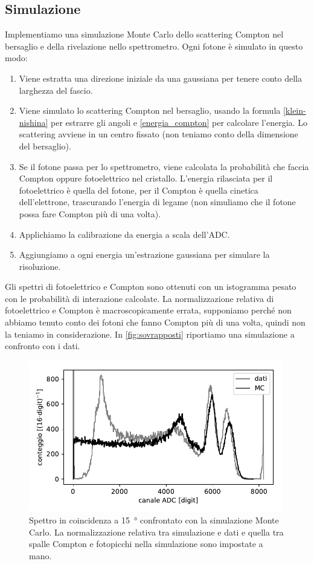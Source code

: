 \subsection{Simulazione}

Implementiamo una simulazione Monte Carlo dello scattering Compton nel bersaglio
e della rivelazione nello spettrometro.
Ogni fotone è simulato in questo modo:
\begin{enumerate}
	\item Viene estratta una direzione iniziale da una gaussiana per tenere conto della larghezza del fascio.
	\item Viene simulato lo scattering Compton nel bersaglio,
	usando la formula \eqref{klein-nishina} per estrarre gli angoli e \eqref{energia_compton} per calcolare l'energia.
	Lo scattering avviene in un centro fissato (non teniamo conto della dimensione del bersaglio).
	\item Se il fotone passa per lo spettrometro,
	viene calcolata la probabilità che faccia Compton oppure fotoelettrico nel cristallo.
	L'energia rilasciata per il fotoelettrico è quella del fotone,
	per il Compton è quella cinetica dell'elettrone, trascurando l'energia di legame
	(non simuliamo che il fotone possa fare Compton più di una volta).
	\item Applichiamo la calibrazione da energia a scala dell'ADC.
	\item Aggiungiamo a ogni energia un'estrazione gaussiana
	per simulare la risoluzione.
\end{enumerate}
Gli spettri di fotoelettrico e Compton sono ottenuti con un istogramma pesato con le probabilità di interazione calcolate.
La normalizzazione relativa di fotoelettrico e Compton è macroscopicamente errata,
supponiamo perché non abbiamo tenuto conto dei fotoni che fanno Compton più di una volta,
quindi non la teniamo in considerazione.
In \autoref{fig:sovrapposti} riportiamo una simulazione a confronto con i dati.

\begin{figure}
	\centering
	\includegraphics[width=30em]{sovrapposti}
	\caption{\label{fig:sovrapposti}
	Spettro in coincidenza a \SI{15}{\degree} confrontato con la simulazione Monte Carlo.
	La normalizzazione relativa tra simulazione e dati
	e quella tra spalle Compton e fotopicchi nella simulazione
	sono impostate a mano.}
\end{figure}
